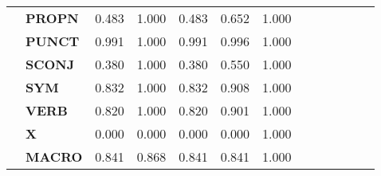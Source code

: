 \begin{longtable}{|l||l||l||l||l||l||l||l||l||l||l||l||l|}
\textbf{} & \textbf{PROPN} & 0.483 & 1.000 & 0.483 & 0.652 & 1.000 \\
\textbf{} & \textbf{PUNCT} & 0.991 & 1.000 & 0.991 & 0.996 & 1.000 \\
\textbf{} & \textbf{SCONJ} & 0.380 & 1.000 & 0.380 & 0.550 & 1.000 \\
\textbf{} & \textbf{SYM} & 0.832 & 1.000 & 0.832 & 0.908 & 1.000 \\
\textbf{} & \textbf{VERB} & 0.820 & 1.000 & 0.820 & 0.901 & 1.000 \\
\textbf{} & \textbf{X} & 0.000 & 0.000 & 0.000 & 0.000 & 1.000 \\
\textbf{} & \textbf{MACRO} & 0.841 & 0.868 & 0.841 & 0.841 & 1.000 \\
\cline{1-7}
\end{longtable}
